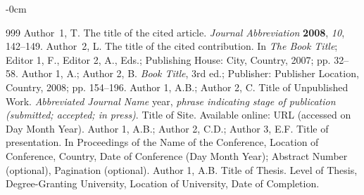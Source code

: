 \documentclass[journal,article,submit,pdftex,moreauthors]{Definitions/mdpi}
\begin{document}
\begin{adjustwidth}{-\extralength}{0cm}



% 


\begin{thebibliography}{999}
Author~1, T. The title of the cited article. {\em Journal Abbreviation} {\bf 2008}, {\em 10}, 142--149.
Author~2, L. The title of the cited contribution. In {\em The Book Title}; Editor 1, F., Editor 2, A., Eds.; Publishing House: City, Country, 2007; pp. 32--58.
Author 1, A.; Author 2, B. \textit{Book Title}, 3rd ed.; Publisher: Publisher Location, Country, 2008; pp. 154--196.
Author 1, A.B.; Author 2, C. Title of Unpublished Work. \textit{Abbreviated Journal Name} year, \textit{phrase indicating stage of publication (submitted; accepted; in press)}.
Title of Site. Available online: URL (accessed on Day Month Year).
Author 1, A.B.; Author 2, C.D.; Author 3, E.F. Title of presentation. In Proceedings of the Name of the Conference, Location of Conference, Country, Date of Conference (Day Month Year); Abstract Number (optional), Pagination (optional).
Author 1, A.B. Title of Thesis. Level of Thesis, Degree-Granting University, Location of University, Date of Completion.
\end{thebibliography}

%


\end{adjustwidth}
\end{document}

